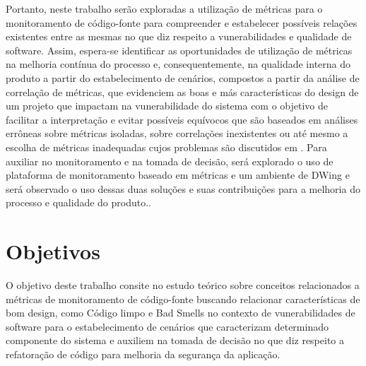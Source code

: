 Portanto, neste trabalho serão exploradas a utilização de métricas para o monitoramento de código-fonte para compreender e estabelecer possíveis relações existentes entre as mesmas no que diz respeito a vunerabilidades e qualidade de software. Assim, espera-se identificar as oportunidades de utilização de métricas na melhoria contínua do processo e, consequentemente, na qualidade interna do produto a partir do estabelecimento de cenários, compostos a partir da análise de correlação de métricas, que evidenciem as boas e más características do design de um projeto que impactam na vunerabilidade do sistema com o objetivo de facilitar a interpretação e evitar possíveis equívocos que são baseados em análises errôneas sobre métricas isoladas, sobre correlações inexistentes ou até mesmo a escolha de métricas inadequadas cujos problemas são discutidos em \cite{chidamber1994}. Para auxiliar no monitoramento e na tomada de decisão, será explorado o uso de plataforma de monitoramento baseado em métricas e um ambiente de DWing e será observado o uso dessas duas soluções e suas contribuições para a melhoria do processo e qualidade do produto..


\section{Objetivos}


O objetivo deste trabalho consite no estudo teórico sobre conceitos relacionados a métricas de monitoramento de código-fonte buscando relacionar características de bom design, como Código limpo e Bad Smells no contexto de vunerabilidades de software  para o estabelecimento de cenários que caracterizam determinado componente do sistema e auxiliem na tomada de decisão no que diz respeito a refatoração de código para melhoria da segurança da aplicação.

